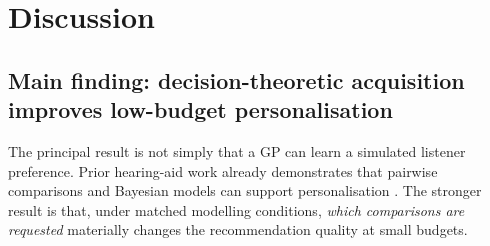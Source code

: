 \documentclass[preprint,12pt]{elsarticle}
\begin{document}
\begin{table}[!htbp]
\centering
\caption{Development-only robustness sweep (seed 424242; qEUBO and GP-random at $T=20$; listener-level 95\% bootstrap CIs). $n$: listeners with a feasible low-gain anchor. Negative differences favour qEUBO.}
\label{tab:robust}
\end{table}

\section{Discussion}
\label{sec:discussion}

\subsection{Main finding: decision-theoretic acquisition improves low-budget personalisation}

The principal result is not simply that a GP can learn a simulated listener preference. Prior hearing-aid work already demonstrates that pairwise comparisons and Bayesian models can support personalisation \cite{birlutiu2010,nielsen2015,vyas2022,ni2024}. The stronger result is that, under matched modelling conditions, \emph{which comparisons are requested} materially changes the recommendation quality at small budgets.
\end{document}

